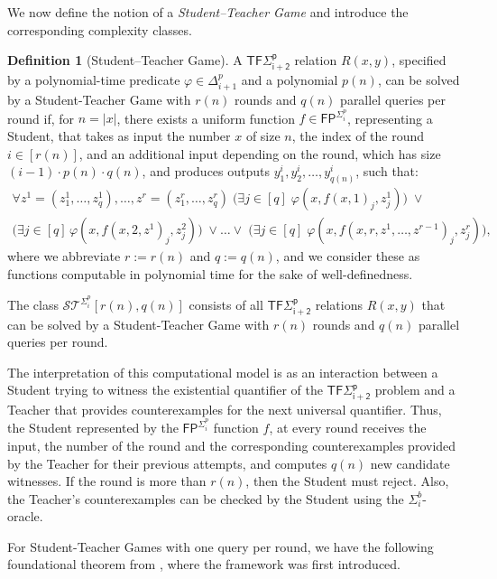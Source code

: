 \documentclass[11pt]{article}
\newcommand{\FP}{\mathsf{FP}}
\theoremstyle{definition}
\theoremstyle{definition}
\newtheorem{definition}[theorem]{Definition}
\theoremstyle{remark}
\begin{document}
We now define the notion of a \emph{Student--Teacher Game} and introduce the corresponding complexity classes.

\begin{definition}[Student--Teacher Game]
A $\mathsf{TF\Sigma^p_{i+2}}$ relation $R(x,y)$, specified by a polynomial-time predicate $\varphi\in \Delta^p_{i+1}$ and a polynomial $p(n)$, can be solved by a Student-Teacher Game with $r(n)$ rounds and $q(n)$ parallel queries per round if, for $n=|x|$, there exists a uniform function $f\in\FP^{\Sigma^p_i}$, representing a Student, that takes as input the number $x$ of size $n$, the index of the round $i\in [r(n)]$, and an additional input depending on the round, which has size $(i-1)\cdot p(n)\cdot q(n)$, and produces outputs $y^i_1, y^i_2, \dots, y^i_{q(n)}$, such that:
\begin{multline}
\forall z^1 = (z^1_1,\dots,z^1_q), \dots, z^{r} = (z^{r}_1,\dots,z^{r}_q) \;
\big(\exists j \in [q]\; \varphi(x,f(x,1)_j,z^1_j)\big)
\;\lor\\
\big(\exists j \in [q]\, \varphi(x,f(x,2,z^1)_j,z^2_j)\big)
\;\lor \dots \lor\;
\big(\exists j \in [q]\; \varphi(x,f(x,r,z^1,\dots,z^{r-1})_j,z^{r}_j)\big),
\nonumber
\end{multline}
where we abbreviate $r := r(n)$ and $q := q(n)$, and we consider these as functions computable in polynomial time for the sake of well-definedness.

The class $\mathcal{ST}^{\Sigma^p_i}[r(n),q(n)]$ consists of all $\mathsf{TF\Sigma^p_{i+2}}$ relations $R(x,y)$ that can be solved by a Student-Teacher Game with $r(n)$ rounds and $q(n)$ parallel queries per round.
\end{definition}

The interpretation of this computational model is as an interaction between a Student trying to witness the existential quantifier of the $\mathsf{TF\Sigma^p_{i+2}}$ problem and a Teacher that provides counterexamples for the next universal quantifier. Thus, the Student represented by the $\FP^{\Sigma^p_i}$ function $f$, at every round receives the input, the number of the round and the corresponding counterexamples provided by the Teacher for their previous attempts, and computes $q(n)$ new candidate witnesses. If the round is more than $r(n)$, then the Student must reject. Also, the Teacher's counterexamples can be checked by the Student using the $\Sigma^b_i$-oracle.

For Student-Teacher Games with one query per round, we have the following foundational theorem from \cite{KrajicekPS90}, where the framework was first introduced.
\end{document}
